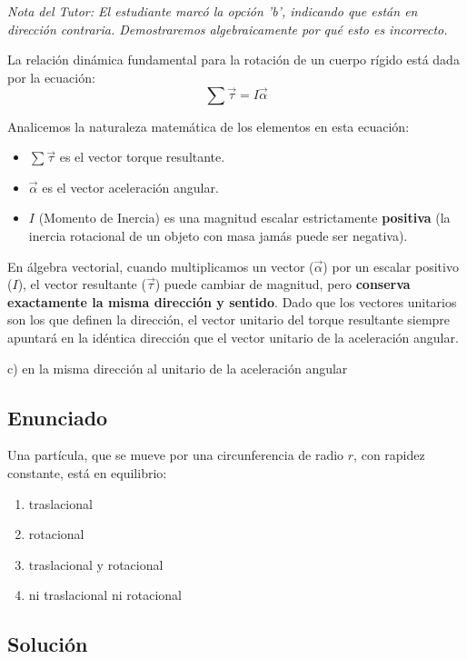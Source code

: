 \documentclass[12pt, a4paper]{article}
\begin{document}
\textit{Nota del Tutor: El estudiante marcó la opción 'b', indicando que están en dirección contraria. Demostraremos algebraicamente por qué esto es incorrecto.}

La relación dinámica fundamental para la rotación de un cuerpo rígido está dada por la ecuación:
$$ \sum \vec{\tau} = I \vec{\alpha} $$

Analicemos la naturaleza matemática de los elementos en esta ecuación:
\begin{itemize}
    \item $\sum \vec{\tau}$ es el vector torque resultante.
    \item $\vec{\alpha}$ es el vector aceleración angular.
    \item $I$ (Momento de Inercia) es una magnitud escalar estrictamente \textbf{positiva} (la inercia rotacional de un objeto con masa jamás puede ser negativa).
\end{itemize}

En álgebra vectorial, cuando multiplicamos un vector ($\vec{\alpha}$) por un escalar positivo ($I$), el vector resultante ($\vec{\tau}$) puede cambiar de magnitud, pero \textbf{conserva exactamente la misma dirección y sentido}.
Dado que los vectores unitarios son los que definen la dirección, el vector unitario del torque resultante siempre apuntará en la idéntica dirección que el vector unitario de la aceleración angular.

\begin{tcolorbox}[colback=green!5!white, colframe=green!50!black, title=Respuesta Final]
\centering \Large c) en la misma dirección al unitario de la aceleración angular
\end{tcolorbox}

\newpage

\subsection*{Enunciado}
Una partícula, que se mueve por una circunferencia de radio $r$, con rapidez constante, está en equilibrio:
\begin{enumerate}[label=\alph*)]
    \item traslacional
    \item rotacional
    \item traslacional y rotacional
    \item ni traslacional ni rotacional
\end{enumerate}

\subsection*{Solución}
\end{document}
